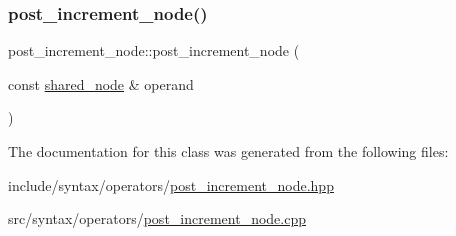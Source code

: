 \subsubsection{\texorpdfstring{post\+\_\+increment\+\_\+node()}{post\_increment\_node()}}
{\footnotesize\ttfamily post\+\_\+increment\+\_\+node\+::post\+\_\+increment\+\_\+node (\begin{DoxyParamCaption}\item[{const \hyperlink{namespacejawe_a3f307481d921b6cbb50cc8511fc2b544}{shared\+\_\+node} \&}]{operand }\end{DoxyParamCaption})}



The documentation for this class was generated from the following files\+:\begin{DoxyCompactItemize}
\item 
include/syntax/operators/\hyperlink{post__increment__node_8hpp}{post\+\_\+increment\+\_\+node.\+hpp}\item 
src/syntax/operators/\hyperlink{post__increment__node_8cpp}{post\+\_\+increment\+\_\+node.\+cpp}\end{DoxyCompactItemize}
